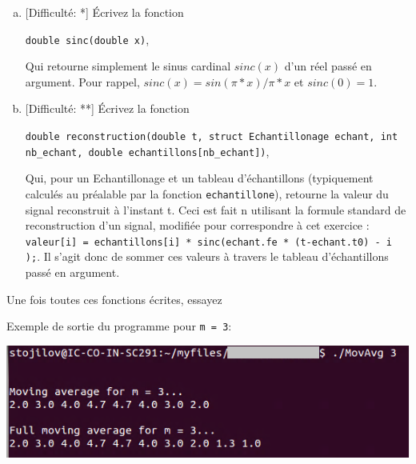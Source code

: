 \documentclass[11pt]{article}
\begin{document}
\begin{enumerate}[a)]
\item \textcolor{mygreen}{[Difficulté: *]}
Écrivez la fonction
\begin{center} 
\texttt{double sinc(double x)}, 
\end{center}
Qui retourne simplement le sinus cardinal $sinc(x)$ d'un réel passé en argument. Pour rappel, $sinc(x) = sin(\pi * x) / \pi*x$ et $sinc(0) = 1$.

\item \textcolor{mygreen}{[Difficulté: **]}
Écrivez la fonction
\begin{center} 
\texttt{double reconstruction(double t, struct Echantillonage echant, int nb_echant, double echantillons[nb_echant])}, 
\end{center}
Qui, pour un Echantillonage et un tableau d'échantillons (typiquement calculés au préalable par la fonction \texttt{echantillone}), retourne la valeur du signal reconstruit à l'instant t. Ceci est fait n utilisant la formule standard de reconstruction d'un signal, modifiée pour correspondre à cet exercice : \texttt{valeur[i] = echantillons[i] * sinc(echant.fe * (t-echant.t0) - i );}. Il s'agit donc de  sommer ces valeurs à travers le tableau d'échantillons passé en argument.

\end{enumerate}

Une fois toutes ces fonctions écrites, essayez

Exemple de sortie du programme pour \texttt{m = 3}:
\begin{center}
\includegraphics[scale=0.75]{Figures/Result.png}
\end{center}
\end{document}
